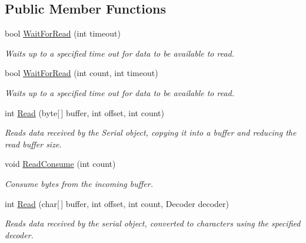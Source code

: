 \subsection*{Public Member Functions}
\begin{DoxyCompactItemize}
\item 
bool \mbox{\hyperlink{interface_r_j_c_p_1_1_i_o_1_1_ports_1_1_native_1_1_i_serial_buffer_stream_data_a15378fb8e021e06d581171d0af31dd65}{Wait\+For\+Read}} (int timeout)
\begin{DoxyCompactList}\small\item\em Waits up to a specified time out for data to be available to read. \end{DoxyCompactList}\item 
bool \mbox{\hyperlink{interface_r_j_c_p_1_1_i_o_1_1_ports_1_1_native_1_1_i_serial_buffer_stream_data_aaec861ebbf441eaf738fec441d449ccf}{Wait\+For\+Read}} (int count, int timeout)
\begin{DoxyCompactList}\small\item\em Waits up to a specified time out for data to be available to read. \end{DoxyCompactList}\item 
int \mbox{\hyperlink{interface_r_j_c_p_1_1_i_o_1_1_ports_1_1_native_1_1_i_serial_buffer_stream_data_a40f667c1b2c794b95ace76dfe846f42d}{Read}} (byte\mbox{[}$\,$\mbox{]} buffer, int offset, int count)
\begin{DoxyCompactList}\small\item\em Reads data received by the Serial object, copying it into a buffer and reducing the read buffer size. \end{DoxyCompactList}\item 
void \mbox{\hyperlink{interface_r_j_c_p_1_1_i_o_1_1_ports_1_1_native_1_1_i_serial_buffer_stream_data_a5dd428e1afe318c0abfc1a2d11421029}{Read\+Consume}} (int count)
\begin{DoxyCompactList}\small\item\em Consume bytes from the incoming buffer. \end{DoxyCompactList}\item 
int \mbox{\hyperlink{interface_r_j_c_p_1_1_i_o_1_1_ports_1_1_native_1_1_i_serial_buffer_stream_data_abdd6ae4bffcd73b226c3a8328317cb24}{Read}} (char\mbox{[}$\,$\mbox{]} buffer, int offset, int count, Decoder decoder)
\begin{DoxyCompactList}\small\item\em Reads data received by the serial object, converted to characters using the specified decoder. \end{DoxyCompactList}\item 

\end{DoxyCompactItemize}
